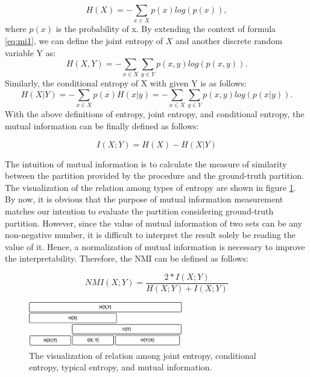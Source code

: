 \documentclass[12pt]{article}
\begin{document}
\begin{equation}\label{eq:mi1}
H(X) = - \sum_{x\in X} p(x)  log(p(x)),
\end{equation}where $p(x)$ is the probability of x.
\bigbreak
By extending the context of  formula \ref{eq:mi1}, we can define the joint entropy of $X$ and another discrete random variable Y as:
\begin{equation}\label{eq:mi2}
H(X, Y) = - \sum_{x\in X} \sum_{y \in Y} p(x, y)  log(p(x, y)).
\end{equation}
\bigbreak
Similarly,  the conditional entropy of X with given Y is as follows:
\begin{equation}\label{eq:mi3}
H(X|Y) = -\sum_{x \in X} p(x) H(x|y) = -\sum_{x \in X}\sum_{y \in Y} p(x,y) log(p(x|y)).
\end{equation}
With the above definitions of entropy, joint entropy, and conditional entropy, the mutual information can be finally defined as follows:

\begin{equation}\label{eq:mi4}
I(X;Y) = H(X) - H(X|Y)
\end{equation}

The intuition of mutual information is to calculate the measure of similarity between the partition provided by the procedure and the ground-truth partition. The visualization of the relation among types of entropy are shown in figure \ref{fig:fig_4}. By now, it is obvious that the purpose of mutual information measurement matches our intention to evaluate the partition considering ground-truth partition. However, since the value of mutual information of two sets can be any non-negative number, it is difficult to interpret the result solely be reading the value of it. Hence, a normalization of mutual information is necessary to improve the interpretability. Therefore, the NMI can be defined as follows:

\begin{equation}\label{eq:nmi}
NMI(X;Y) = \frac{2*I(X; Y)}{H(X;Y) + I(X;Y)}
\end{equation}

\begin{figure}
\centering
\includegraphics[width=0.6\textwidth]{fig_4.png}

\caption{\label{fig:fig_4}The visualization of relation among joint entropy, conditional entropy, typical entropy, and mutual information.}
\end{figure}
\end{document}
